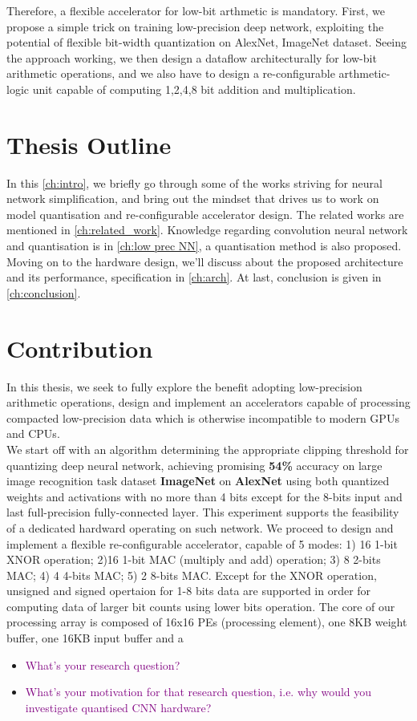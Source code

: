 Therefore, a flexible accelerator for low-bit arthmetic is mandatory. First, we propose a simple trick on training low-precision deep network, exploiting the potential of flexible bit-width quantization on AlexNet, ImageNet dataset. Seeing the approach working, we then design a dataflow architecturally for low-bit arithmetic operations, and we also have to design a re-configurable arthmetic-logic unit capable of computing 1,2,4,8 bit addition and multiplication. 
\section{Thesis Outline}
In this \autoref{ch:intro}, we briefly go through some of the works striving for neural network simplification, and bring out the mindset that drives us to work on model quantisation and re-configurable accelerator design. The related works are mentioned in \autoref{ch:related_work}. Knowledge regarding convolution neural network and quantisation is in \autoref{ch:low prec NN}, a quantisation method is also proposed. Moving on to the hardware design, we'll discuss about the proposed architecture and its performance, specification in \autoref{ch:arch}. At last, conclusion is given in \autoref{ch:conclusion}.  
\section{Contribution}
In this thesis, we seek to fully explore the benefit adopting low-precision arithmetic operations, design and implement an accelerators capable of processing compacted low-precision data which is otherwise incompatible to modern GPUs and CPUs. \\
We start off with an algorithm determining the appropriate clipping threshold for quantizing deep neural network, achieving promising \textbf{54\%} accuracy on large image recognition task dataset \textbf{ImageNet} on \textbf{AlexNet} using both quantized weights and activations with no more than 4 bits except for the 8-bits input and last full-precision fully-connected layer. This experiment supports the feasibility of a dedicated hardward operating on such network. We proceed to design and implement a flexible re-configurable accelerator, capable of 5 modes: 1) 16 1-bit XNOR operation; 2)16 1-bit MAC (multiply and add) operation; 3) 8 2-bits MAC; 4) 4 4-bits MAC; 5) 2 8-bits MAC. Except for the XNOR operation, unsigned and signed opertaion for 1-8 bits data are supported in order for computing data of larger bit counts using lower bits operation. The core of our processing array is composed of 16x16 PEs (processing element), one 8KB weight buffer, one 16KB input buffer and a \TODO{}


\begin{itemize}
    \item \textcolor{purple}{What's your research question?}
    \item \textcolor{purple}{What's your motivation for that research question, i.e. why would you investigate quantised CNN hardware?}
\end{itemize}
